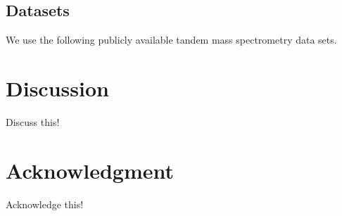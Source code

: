 \documentclass{bioinfo}
\begin{document}
\subsection*{Datasets}
We use the following publicly available tandem mass spectrometry data
sets.

\section{Discussion}
Discuss this!

\section*{Acknowledgment}

Acknowledge this!





 
\end{document}
